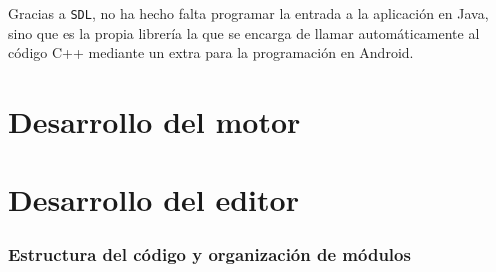 \smallskip

Gracias a \texttt{SDL}, no ha hecho falta programar la entrada a la aplicación en Java, sino que es la propia librería la que se encarga de llamar automáticamente al código C++ mediante un extra para la programación en Android.
\section{Desarrollo del motor}

\section{Desarrollo del editor}
\subsubsection{Estructura del código y organización de módulos}